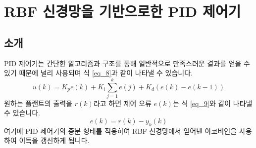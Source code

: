 \section{RBF 신경망을 기반으로한 PID 제어기}
\subsection{소개}
PID 제어기는 간단한 알고리즘과 구조를 통해 일반적으로 만족스러운 결과를 얻을 수 있기 때문에 널리 사용되며 식 \ref{eq_8}과 같이 나타낼 수 있습니다.
%
\begin{equation} \label{eq_8}
u(k)=K_{p}e(k)+K_{i}\sum_{j=1}^{k}e(j)+K_{d}(e(k)-e(k-1))  
\end{equation}
%
원하는 플랜트의 출력을 \(r(k)\)라고 하면 제어 오류 \(e(k)\)는 식 \ref{eq_9}와 같이 나타낼 수 있습니다.
%
\begin{equation} \label{eq_9}
e(k)=r(k)-y_{k}(k)  
\end{equation}
%
여기에 PID 제어기의 증분 형태를 적용하여 RBF 신경망에서 얻어낸 야코비언을 사용하여 이득을 갱신하게 됩니다.
%
